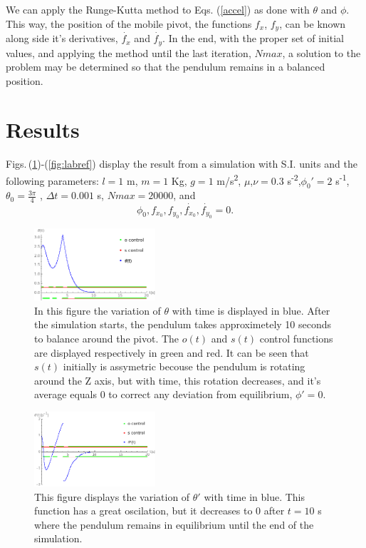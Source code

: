 \documentclass[prd,twocolumn,nofootinbib,showpacs]{revtex4-1}
\begin{document}
\noindent We can apply the Runge-Kutta method to Eqs. (\ref{accel}) as done with $\theta$ and $\phi$. This way, the position of the mobile pivot, the functions $f_x$, $f_y$,  can be known along side it's derivatives, $\dot{f_x}$ and $\dot{f_y}$. In the end, with the proper set of initial values, and applying the method until the last iteration, $Nmax$, a solution to the problem may be determined so that the pendulum remains in a balanced position.

\section{Results}
Figs.$\,$(\ref{fig:teta})-(\ref{fig:labref}) display the result from a simulation with S.I. units and the following parameters: $l=1$ m, $m=1$ Kg, $g=1$ m/s\textsuperscript{2}, $\mu$,$\nu=0.3$ s\textsuperscript{-2},$\phi_0'=2$ s\textsuperscript{-1}, $\theta_0=\frac{3\pi}{4}$ , $\Delta t=0.001$ s, $Nmax=20000$,
and 
\begin{equation}
    \phi_0,f_{x_0},f_{y_0},\dot{f_{x_0}},\dot{f_{y_0}}=0. 
\end{equation}
\begin{figure}[H]
    \centering
    \includegraphics[width=0.40\textwidth]{Estabilizacaoteta1.png}
    \caption{In this figure the variation of $\theta$ with time is displayed in blue. After the simulation starts, the pendulum takes approximetely 10 seconds to balance around the pivot. The $o(t)$ and $s(t)$ control functions are displayed respectively in green and red. It can be seen that $s(t)$ initially is assymetric becouse the pendulum is rotating around the Z axis, but with time, this rotation decreases, and it's average equals 0 to correct any deviation from equilibrium, $\phi'=0$.}
    \label{fig:teta}
\end{figure}

\begin{figure}[H]
    \centering
    \includegraphics[width=0.40\textwidth]{Estabilizacaotetalinha1.png}
    \caption{This figure displays the variation of $\theta'$ with time in blue. This function has a great oscilation, but it decreases to $0$ after $t=10$ s where the pendulum remains in equilibrium until the end of the simulation.}
    \label{fig:tetalinha}
\end{figure}
\end{document}
